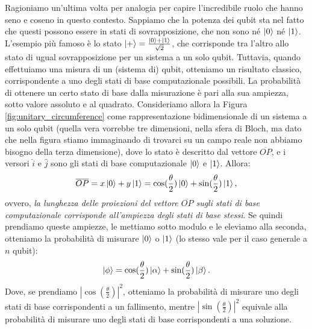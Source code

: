 \documentclass{book}
\theoremstyle{definition}
\theoremstyle{definition}
\theoremstyle{definition}
\theoremstyle{plain}
\theoremstyle{plain}
\theoremstyle{plain}
\theoremstyle{plain}
\begin{document}
Ragioniamo un'ultima volta per analogia per capire l'incredibile ruolo che hanno seno e coseno in questo contesto. Sappiamo che la potenza dei qubit sta nel fatto che questi possono essere in stati di sovrapposizione, che non sono né $\ket{0}$ né $\ket{1}$. L'esempio più famoso è lo stato $\ket{+} = \frac{\ket{0} + \ket{1}}{\sqrt{2}}$, che corrisponde tra l'altro allo stato di ugual sovrapposizione per un sistema a un solo qubit. Tuttavia, quando effettuiamo una misura di un (sistema di) qubit, otteniamo un risultato classico, corrispondente a uno degli stati di base computazionale possibili. La probabilità di ottenere un certo stato di base dalla misurazione è pari alla sua ampiezza, sotto valore assoluto e al quadrato. Consideriamo allora la Figura \ref{fig:unitary_circumference} come rappresentazione bidimensionale di un sistema a un solo qubit (quella vera vorrebbe tre dimensioni, nella sfera di Bloch, ma dato che nella figura stiamo immaginando di trovarci su un campo reale non abbiamo bisogno della terza dimensione), dove lo stato è descritto dal vettore $\overline{OP}$, e i versori $\hat{i}$ e $\hat{j}$ sono gli stati di base computazionale $\ket{0}$ e $\ket{1}$. Allora:
\begin{displaymath}
\overline{OP} = x \ket{0} + y \ket{1} = \cos(\frac{\theta}{2}) \ket{0} + \sin(\frac{\theta}{2}) \ket{1},
\end{displaymath}
ovvero, \emph{la lunghezza delle proiezioni del vettore $\overline{OP}$ sugli stati di base computazionale corrisponde all'ampiezza degli stati di base stessi}. Se quindi prendiamo queste ampiezze, le mettiamo sotto modulo e le eleviamo alla seconda, otteniamo la probabilità di misurare $\ket{0}$ o $\ket{1}$ (lo stesso vale per il caso generale a $n$ qubit):
\begin{displaymath}
\ket{\phi} = \cos(\frac{\theta}{2}) \ket{\alpha} + \sin(\frac{\theta}{2}) \ket{\beta}.
\end{displaymath}
Dove, se prendiamo $\left\lvert \cos(\frac{\theta}{2}) \right\rvert^{2}$, otteniamo la probabilità di misurare uno degli stati di base corrispondenti a un fallimento, mentre $\left\lvert \sin(\frac{\theta}{2}) \right\rvert^{2}$ equivale alla probabilità di misurare uno degli stati di base corrispondenti a una soluzione.
\end{document}
